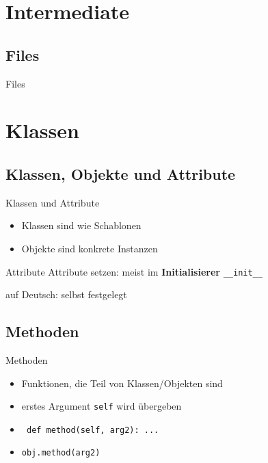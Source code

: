 \section{Intermediate}

\subsection{Files}
\begin{frame}{Files}
	
	
\end{frame}

\section{Klassen}
\subsection{Klassen, Objekte und Attribute}
\begin{frame}{Klassen und Attribute}
	\begin{itemize}
		\item<1-> Klassen sind wie Schablonen
		\item<2-> Objekte sind konkrete Instanzen
	\end{itemize}
\end{frame}

\begin{frame}{Attribute}
	Attribute setzen: meist im \textbf{Initialisierer} \alert{\tt \_\_init\_\_}
	
	auf Deutsch: selbst festgelegt
\end{frame}

\subsection{Methoden}
\begin{frame}{Methoden}
	\begin{itemize}
		\item Funktionen, die Teil von Klassen/Objekten sind
		\item<2-> erstes Argument \texttt{self} wird übergeben
		\item<3-> \texttt{	def method(self, arg2): ...}
		\item<3-> \texttt{obj.method(arg2)}
	\end{itemize}
\end{frame}

